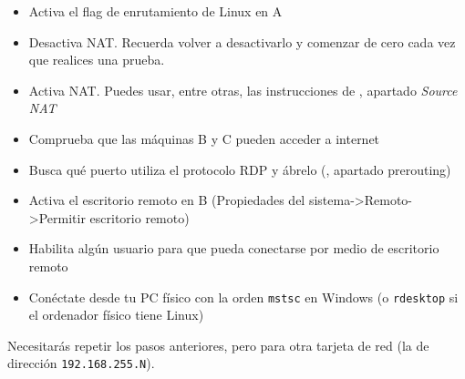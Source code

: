 \begin{homeworkProblem}
  \begin{itemize}
  \item Activa el flag de enrutamiento de Linux en A
  \item Desactiva NAT. Recuerda volver a desactivarlo y comenzar de cero cada vez que realices una prueba.
    \begin{comment}
      iptables -t nat –F
    \end{comment}
  \item Activa NAT. Puedes usar, entre otras, las instrucciones de , apartado \textit{Source NAT}
  \item Comprueba que las máquinas B y C pueden acceder a internet
  \end{itemize}
\end{homeworkProblem}

\begin{homeworkProblem}
  \begin{itemize}
    
  \item Busca qué puerto utiliza el protocolo RDP y ábrelo (, apartado prerouting)
  \item Activa el escritorio remoto en B (Propiedades del sistema->Remoto->Permitir escritorio remoto)
    
  \item Habilita algún usuario para que pueda conectarse por medio de escritorio remoto
  \item Conéctate desde tu PC físico con la orden \texttt{mstsc} en  Windows (o \texttt{rdesktop} si el ordenador físico tiene Linux)
  \end{itemize}

\end{homeworkProblem}


\begin{homeworkProblem}
  Necesitarás repetir los pasos anteriores, pero para otra tarjeta de red (la de dirección \texttt{192.168.255.N}).
\end{homeworkProblem}


